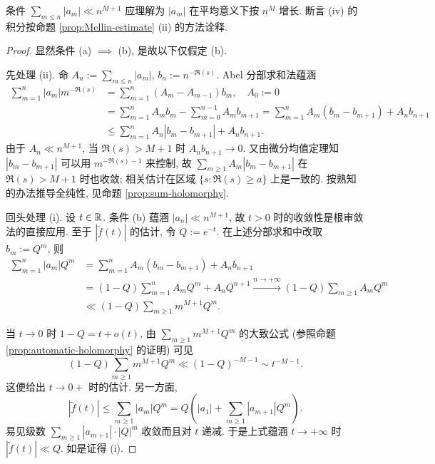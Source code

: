条件 $\sum_{m \leq n} |a_m| \ll n^{M + 1}$ 应理解为 $|a_m|$ 在平均意义下按 $n^M$ 增长. 断言 (iv) 的积分按命题 \ref{prop:Mellin-estimate} (ii) 的方法诠释.
\begin{proof}
	显然条件 (a) $\implies$ (b), 是故以下仅假定 (b).

	先处理 (ii). 命 $A_n := \sum_{m \leq n} |a_m|$, $b_n := n^{-\Re(s)}$. Abel 分部求和法蕴涵
	\begin{align*}
		\sum_{m=1}^n |a_m| m^{-\Re(s)} & = \sum_{m=1}^n (A_m - A_{m-1}) b_m, \quad A_0 := 0 \\
		& = \sum_{m=1}^n A_m b_m - \sum_{m=0}^{n-1} A_m b_{m+1} = \sum_{m=1}^n A_m \left( b_m - b_{m+1} \right) + A_n b_{n+1} \\
		& \leq \sum_{m=1}^n A_n \left| b_m - b_{m+1} \right| + A_n b_{n+1} .
	\end{align*}
	由于 $A_n \ll n^{M+1}$, 当 $\Re(s) > M+1$ 时 $A_n b_{n+1} \to 0$. 又由微分均值定理知 $\left| b_m - b_{m+1} \right|$ 可以用 $m^{-\Re(s)-1}$ 来控制, 故 $\sum_{m \geq 1} A_m \left| b_m - b_{m+1} \right|$ 在 $\Re(s) > M+1$ 时也收敛; 相关估计在区域 $\{s: \Re(s) \geq a\}$ 上是一致的. 按熟知的办法推导全纯性, 见命题 \ref{prop:sum-holomorphy}.

	回头处理 (i). 设 $t \in \mathbb{R}$. 条件 (b) 蕴涵 $|a_n| \ll n^{M+1}$, 故 $t > 0$ 时的收敛性是根审敛法的直接应用. 至于 $|\tilde{f}(t)|$ 的估计, 令 $Q := e^{-t}$. 在上述分部求和中改取 $b_m := Q^m$, 则
	\begin{align*}
		\sum_{m=1}^n |a_m| Q^m & = \sum_{m=1}^n A_m \left( b_m - b_{m+1} \right) + A_n b_{n+1} \\
		& = (1 - Q) \sum_{m=1}^n A_m Q^m + A_n Q^{n+1} \xrightarrow{n \to +\infty} (1 - Q) \sum_{m \geq 1} A_m Q^m \\
		& \ll (1 - Q) \sum_{m \geq 1} m^{M+1} Q^m.
	\end{align*}

	当 $t \to 0$ 时 $1 - Q = t + o(t)$, 由 $\sum_{m \geq 1} m^{M+1} Q^m$ 的大致公式 (参照命题 \ref{prop:automatic-holomorphy} 的证明) 可见
	\[ (1 - Q) \sum_{m \geq 1} m^{M+1} Q^m \ll (1 - Q)^{-M - 1} \sim t^{-M - 1}. \]
	这便给出 $t \to 0+$ 时的估计. 另一方面,
	\[ |\tilde{f}(t)| \leq \sum_{m \geq 1} |a_m| Q^m = Q \left( |a_1| + \sum_{m \geq 1} |a_{m+1}| Q^m \right). \]
	易见级数 $\sum_{m \geq 1} |a_{m+1}| \cdot |Q|^m$ 收敛而且对 $t$ 递减. 于是上式蕴涵 $t \to +\infty$ 时 $|\tilde{f}(t)| \ll Q$. 如是证得 (i).


\end{proof}
